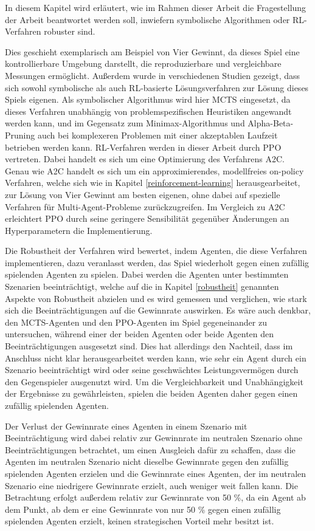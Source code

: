 \label{konzept}

In diesem Kapitel wird erläutert, wie im Rahmen dieser Arbeit die Fragestellung der Arbeit beantwortet werden soll, inwiefern symbolische Algorithmen oder RL-Verfahren robuster sind.

Dies geschieht exemplarisch am Beispiel von Vier Gewinnt, da dieses Spiel eine kontrollierbare Umgebung darstellt, die reproduzierbare und vergleichbare Messungen ermöglicht. Außerdem wurde in verschiedenen Studien gezeigt, dass sich sowohl symbolische als auch RL-basierte Lösungsverfahren zur Lösung dieses Spiels eigenen. Als symbolischer Algorithmus wird hier MCTS eingesetzt, da dieses Verfahren unabhängig von problemspezifischen Heuristiken angewandt werden kann, und im Gegensatz zum Minimax-Algorithmus und Alpha-Beta-Pruning auch bei komplexeren Problemen mit einer akzeptablen Laufzeit betrieben werden kann. RL-Verfahren werden in dieser Arbeit durch PPO vertreten. Dabei handelt es sich um eine Optimierung des Verfahrens A2C. Genau wie A2C handelt es sich um ein approximierendes, modellfreies on-policy Verfahren, welche sich wie in Kapitel \ref{reinforcement-learning} herausgearbeitet, zur Lösung von Vier Gewinnt am besten eigenen, ohne dabei auf spezielle Verfahren für Multi-Agent-Probleme zurückzugreifen. Im Vergleich zu A2C erleichtert PPO durch seine geringere Sensibilität gegenüber Änderungen an Hyperparametern die Implementierung.

Die Robustheit der Verfahren wird bewertet, indem Agenten, die diese Verfahren implementieren, dazu veranlasst werden, das Spiel wiederholt gegen einen zufällig spielenden Agenten zu spielen. Dabei werden die Agenten unter bestimmten Szenarien beeinträchtigt, welche auf die in Kapitel \ref{robustheit} genannten Aspekte von Robustheit abzielen und es wird gemessen und verglichen, wie stark sich die Beeinträchtigungen auf die Gewinnrate auswirken. Es wäre auch denkbar, den MCTS-Agenten und den PPO-Agenten im Spiel gegeneinander zu untersuchen, während einer der beiden Agenten oder beide Agenten den Beeinträchtigungen ausgesetzt sind. Dies hat allerdings den Nachteil, dass im Anschluss nicht klar herausgearbeitet werden kann, wie sehr ein Agent durch ein Szenario beeinträchtigt wird oder seine geschwächtes Leistungsvermögen durch den Gegenspieler ausgenutzt wird. Um die Vergleichbarkeit und Unabhängigkeit der Ergebnisse zu gewährleisten, spielen die beiden Agenten daher gegen einen zufällig spielenden Agenten.

Der Verlust der Gewinnrate eines Agenten in einem Szenario mit Beeinträchtigung wird dabei relativ zur Gewinnrate im neutralen Szenario ohne Beeinträchtigungen betrachtet, um einen Ausgleich dafür zu schaffen, dass die Agenten im neutralen Szenario nicht dieselbe Gewinnrate gegen den zufällig spielenden Agenten erzielen und die Gewinnrate eines Agenten, der im neutralen Szenario eine niedrigere Gewinnrate erzielt, auch weniger weit fallen kann. Die Betrachtung erfolgt außerdem relativ zur Gewinnrate von 50 \%, da ein Agent ab dem Punkt, ab dem er eine Gewinnrate von nur 50 \% gegen einen zufällig spielenden Agenten erzielt, keinen strategischen Vorteil mehr besitzt ist.

